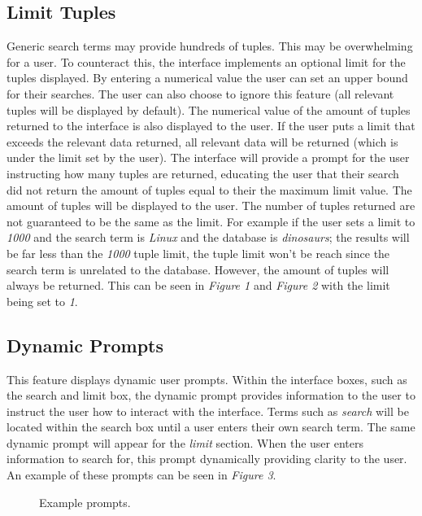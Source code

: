 \documentclass{sig-alternate-05-2015}
\begin{document}
 \subsection{Limit Tuples}
 Generic search terms may provide hundreds of tuples. This may be overwhelming for a user. To counteract this, the interface implements an optional limit for the tuples displayed. By entering a numerical value the user can set an upper bound for their searches. The user can also choose to ignore this feature (all relevant tuples will be displayed by default). The numerical value of the amount of tuples returned to the interface is also displayed to the user. If the user puts a limit that exceeds the relevant data returned, all relevant data will be returned (which is under the limit set by the user). The interface will provide a prompt for the user instructing how many tuples are returned, educating the user that their search did not return the amount of tuples equal to their the maximum limit value. The amount of tuples will be displayed to the user. The number of tuples returned are not guaranteed to be the same as the limit. For example if the user sets a limit to \textit{1000} and the search term is \textit{Linux} and the database is \textit{dinosaurs}; the results will be far less than the \textit{1000} tuple limit, the tuple limit won't be reach since the search term is unrelated to the database. However, the amount of tuples will always be returned. This can be seen in \textit{Figure 1} and \textit{Figure 2} with the limit being set to \textit{1}.
 
 \subsection{Dynamic Prompts }
  This feature displays dynamic user prompts. Within the interface boxes, such as the search and limit box, the dynamic prompt provides information to the user to instruct the user how to interact with the interface. Terms such as \textit{search} will be located within the search box until a user enters their own search term. The same dynamic prompt will appear for the \textit{limit} section. When the user enters information to search for, this prompt dynamically providing clarity to the user. An example of these prompts can be seen in \textit{Figure 3}.
  ~
\begin{figure}[h]
\center
{}
\caption{Example prompts.}
\center
\end{figure}
~
\end{document}
